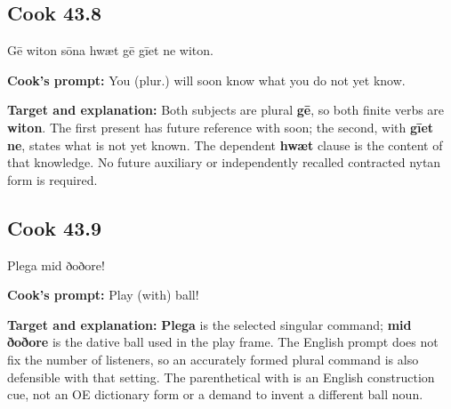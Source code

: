 \par\begin{minipage}{\linewidth}\raggedright
\subsection*{Cook 43.8}

Gē witon sōna hwæt gē gīet ne witon.

\textbf{Cook's prompt:} You (plur.) will soon know what you do not yet know.

\textbf{Target and explanation:} Both subjects are plural \textbf{gē}, so both finite verbs are \textbf{witon}. The first present has future reference with soon; the second, with \textbf{gīet ne}, states what is not yet known. The dependent \textbf{hwæt} clause is the content of that knowledge. No future auxiliary or independently recalled contracted nytan form is required.

\end{minipage}\par\addvspace{4pt}

\par\begin{minipage}{\linewidth}\raggedright
\subsection*{Cook 43.9}

Plega mid ðoðore!

\textbf{Cook's prompt:} Play (with) ball!

\textbf{Target and explanation:} \textbf{Plega} is the selected singular command; \textbf{mid ðoðore} is the dative ball used in the play frame. The English prompt does not fix the number of listeners, so an accurately formed plural command is also defensible with that setting. The parenthetical with is an English construction cue, not an OE dictionary form or a demand to invent a different ball noun.

\end{minipage}\par\addvspace{4pt}

